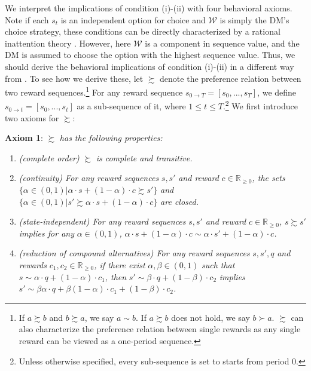 \documentclass[
  12pt,
]{article}
\begin{document}
We interpret the implications of condition (i)-(ii) with four behavioral
axioms. Note if each \(s_t\) is an independent option for choice and
\(\mathcal{W}\) is simply the DM's choice strategy, these conditions can
be directly characterized by a rational inattention theory
\citep{caplin2022rationally}. However, here \(\mathcal{W}\) is a
component in sequence value, and the DM is assumed to choose the option
with the highest sequence value. Thus, we should derive the behavioral
implications of condition (i)-(ii) in a different way from
\citet{caplin2022rationally}. To see how we derive these, let
\(\succsim\) denote the preference relation between two reward
sequences.\footnote{If \(a \succsim b\) and \(b\succsim a\), we say
  \(a\sim b\). If \(a \succsim b\) does not hold, we say \(b\succ a\).
  \(\succsim\) can also characterize the preference relation between
  single rewards as any single reward can be viewed as a one-period
  sequence.} For any reward sequence
\(s_{0\rightarrow T}=[s_0,...,s_T]\), we define
\(s_{0\rightarrow t}=[s_0,...,s_t]\) as a sub-sequence of it, where
\(1\leq t\leq T\).\footnote{Unless otherwise specified, every
  sub-sequence is set to starts from period 0.} We first introduce two
axioms for \(\succsim\):

\noindent \textbf{Axiom 1}: \(\succsim\) \emph{has the following
properties:}

\begin{enumerate}
\def\labelenumi{(\alph{enumi})}
\item
  \emph{(complete order)} \(\succsim\) \emph{is complete and
  transitive.}
\item
  \emph{(continuity) For any reward sequences} \(s,s'\) \emph{and
  reward} \(c\in \mathbb{R}_{\geq 0}\)\emph{, the sets}
  \(\{\alpha \in(0,1) | \alpha\cdot s + (1-\alpha)\cdot c \succsim s'\}\)
  \emph{and}
  \(\{\alpha \in(0,1) | s' \succsim \alpha\cdot s + (1-\alpha)\cdot c \}\)
  \emph{are closed.}
\item
  \emph{(state-independent) For any reward sequences} \(s,s'\) \emph{and
  reward} \(c\in \mathbb{R}_{\geq 0}\)\emph{,} \(s \succsim s'\)
  \emph{implies for any} \(\alpha \in (0,1)\)\emph{,}
  \(\alpha\cdot s + (1-\alpha)\cdot c \sim \alpha \cdot s' + (1-\alpha) \cdot c\)\emph{.}
\item
  \emph{(reduction of compound alternatives) For any reward sequences}
  \(s,s',q\) \emph{and rewards}
  \(c_1,c_2\in \mathbb{R}_{\geq 0}\)\emph{, if there exist}
  \(\alpha, \beta \in (0,1)\) \emph{such that}
  \(s \sim \alpha \cdot q + (1-\alpha) \cdot c_1\)\emph{, then}
  \(s' \sim \beta \cdot q + (1-\beta)\cdot c_2\) \emph{implies}
  \(s' \sim \beta\alpha\cdot q+\beta(1-\alpha)\cdot c_1 + (1-\beta)\cdot c_2\)\emph{.}
\end{enumerate}
\end{document}
